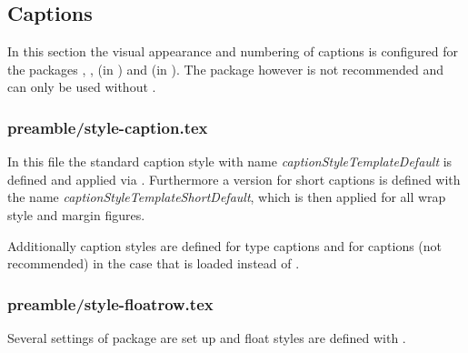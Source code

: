 \subsection{Captions}
\label{sec:style:captions}

In this section the visual appearance and numbering of captions is configured 
for the packages , , 
 (in ) and  (in ). 
The package  however is not 
recommended and can only be used without .


\subsubsection{preamble/style-caption.tex}

In this file the standard caption style with name \emph{captionStyleTemplateDefault} is defined and applied via . Furthermore a version for short captions is defined with the name \emph{captionStyleTemplateShortDefault}, which is then applied for all wrap style and margin figures.

Additionally caption styles are defined for  type captions and for  captions (not recommended) in the case that  is loaded instead of .


\subsubsection{preamble/style-floatrow.tex}

Several settings of package  are set up and float styles are defined with .




